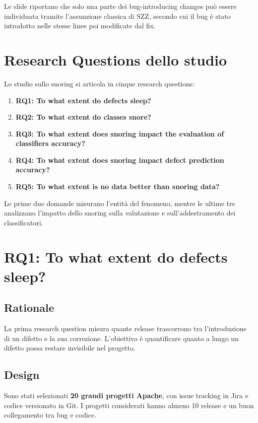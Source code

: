 \begin{notaslide}
Le slide riportano che solo una parte dei bug-introducing changes può essere individuata tramite l'assunzione classica di SZZ, secondo cui il bug è stato introdotto nelle stesse linee poi modificate dal fix.
\end{notaslide}

\section{Research Questions dello studio}

Lo studio sullo snoring si articola in cinque research questions:

\begin{enumerate}
    \item \textbf{RQ1: To what extent do defects sleep?}
    \item \textbf{RQ2: To what extent do classes snore?}
    \item \textbf{RQ3: To what extent does snoring impact the evaluation of classifiers accuracy?}
    \item \textbf{RQ4: To what extent does snoring impact defect prediction accuracy?}
    \item \textbf{RQ5: To what extent is no data better than snoring data?}
\end{enumerate}

Le prime due domande misurano l'entità del fenomeno, mentre le ultime tre analizzano l'impatto dello snoring sulla valutazione e sull'addestramento dei classificatori.

\section{RQ1: To what extent do defects sleep?}

\subsection{Rationale}

La prima research question misura quante release trascorrono tra l'introduzione di un difetto e la sua correzione. L'obiettivo è quantificare quanto a lungo un difetto possa restare invisibile nel progetto.

\subsection{Design}

Sono stati selezionati \textbf{20 grandi progetti Apache}, con issue tracking in Jira e codice versionato in Git. I progetti considerati hanno almeno 10 release e un buon collegamento tra bug e codice.

